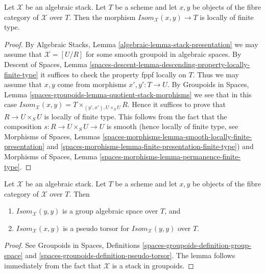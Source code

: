 \begin{lemma}
\label{lemma-isom-locally-finite-type}
Let $\mathcal{X}$ be an algebraic stack.
Let $T$ be a scheme and let $x, y$ be objects of the fibre category of
$\mathcal{X}$ over $T$. Then the morphism
$\textit{Isom}_{\mathcal{X}}(x, y) \to T$ is locally of finite type.
\end{lemma}

\begin{proof}
By
Algebraic Stacks, Lemma \ref{algebraic-lemma-stack-presentation}
we may assume that $\mathcal{X} = [U/R]$ for some smooth
groupoid in algebraic spaces.
By
Descent of Spaces,
Lemma \ref{spaces-descent-lemma-descending-property-locally-finite-type}
it suffices to check the property fppf locally on $T$.
Thus we may assume that $x, y$ come from morphisms
$x', y' : T \to U$. By
Groupoids in Spaces,
Lemma \ref{spaces-groupoids-lemma-quotient-stack-morphisms}
we see that in this case
$\textit{Isom}_{\mathcal{X}}(x, y) = T \times_{(y', x'), U \times_S U} R$.
Hence it suffices to prove that $R \to U \times_S U$ is
locally of finite type. This follows from the fact that the composition
$s : R \to U \times_S U \to U$ is smooth (hence locally of finite type, see
Morphisms of Spaces, Lemmas
\ref{spaces-morphisms-lemma-smooth-locally-finite-presentation} and
\ref{spaces-morphisms-lemma-finite-presentation-finite-type})
and
Morphisms of Spaces, Lemma \ref{spaces-morphisms-lemma-permanence-finite-type}.
\end{proof}

\begin{lemma}
\label{lemma-isom-pseudo-torsor-aut}
Let $\mathcal{X}$ be an algebraic stack.
Let $T$ be a scheme and let $x, y$ be objects of the fibre category of
$\mathcal{X}$ over $T$. Then
\begin{enumerate}
\item $\textit{Isom}_{\mathcal{X}}(y, y)$ is a group algebraic space
over $T$, and
\item $\textit{Isom}_{\mathcal{X}}(x, y)$ is a pseudo torsor for
$\textit{Isom}_{\mathcal{X}}(y, y)$ over $T$.
\end{enumerate}
\end{lemma}

\begin{proof}
See
Groupoids in Spaces,
Definitions \ref{spaces-groupoids-definition-group-space} and
\ref{spaces-groupoids-definition-pseudo-torsor}.
The lemma follows immediately from the fact that $\mathcal{X}$ is a
stack in groupoids.
\end{proof}

